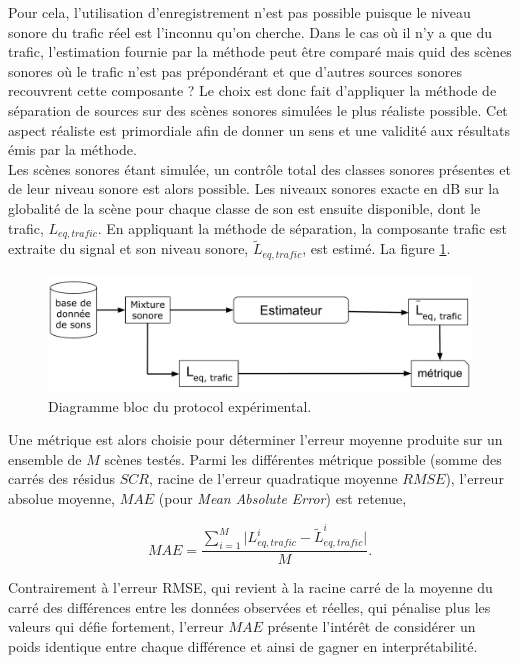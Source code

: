 Pour cela, l'utilisation d'enregistrement n'est pas possible puisque le niveau sonore du trafic réel est l'inconnu qu'on cherche. Dans le cas où il n'y a que du trafic, l'estimation fournie par la méthode peut être comparé mais quid des scènes sonores où le trafic n'est pas prépondérant et que d'autres sources sonores recouvrent cette composante ?
Le choix est donc fait d'appliquer la méthode de séparation de sources sur des scènes sonores simulées le plus réaliste possible. Cet aspect réaliste est primordiale afin de donner un sens et une validité aux résultats émis par la méthode.\\


Les scènes sonores étant simulée, un contrôle total des classes sonores présentes et de leur niveau sonore est alors possible. Les niveaux sonores exacte en dB sur la globalité de la scène pour chaque classe de son est ensuite disponible, dont le trafic, $L_{eq,trafic}$. En appliquant la méthode de séparation, la composante trafic est extraite du signal et son niveau sonore, $\tilde{L}_{eq,trafic}$, est estimé. La figure \ref{fig:diagramBlocProtocol}.

\begin{figure}[t]
\centering
\includegraphics[width=0.7\linewidth]{./figures/NMF/Bloc_diagram_estimateur_FR.pdf}
\caption{Diagramme bloc du protocol expérimental.}
\label{fig:diagramBlocProtocol}
\end{figure}


Une métrique est alors choisie pour déterminer l'erreur moyenne produite sur un ensemble de $M$ scènes testés. Parmi les différentes métrique possible (somme des carrés des résidus $SCR$, racine de l'erreur quadratique moyenne $RMSE$), l'erreur absolue moyenne, $MAE$ (pour \textit{Mean Absolute Error}) est retenue,  

\begin{equation}
MAE = \frac{\sum_{i = 1}^{M} \vert L_{eq, trafic}^i - \tilde{L}_{eq, trafic}^i \vert}{M}.
\end{equation}

Contrairement à l'erreur RMSE, qui revient à la racine carré de la moyenne du carré des différences entre les données observées et réelles, qui pénalise plus les valeurs qui défie fortement, l'erreur $MAE$ présente l'intérêt de considérer un poids identique entre chaque différence et ainsi de gagner en interprétabilité.\\

